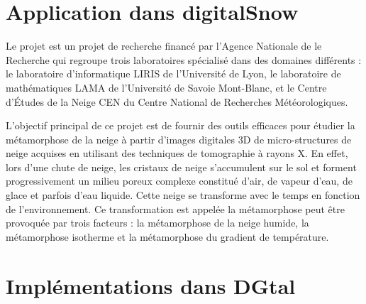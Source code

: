 %
\section{Application dans digitalSnow}%
\label{sec:applications:digitalsnow}
%
Le projet \digitalSnow est un projet de recherche financé par l'Agence Nationale de le
Recherche qui regroupe trois laboratoires spécialisé dans des domaines
différents : le laboratoire d'informatique \textsc{LIRIS} de l'Université de
Lyon, le laboratoire de mathématiques \textsc{LAMA} de l'Université de Savoie
Mont-Blanc, et le Centre d'Études de la Neige \textsc{CEN} du Centre National de
Recherches Météorologiques.


L'objectif principal de ce projet est de fournir des outils efficaces pour
étudier la métamorphose de la neige à partir d'images digitales 3D de
micro-structures de neige acquises en utilisant des techniques de tomographie à
rayons X. En effet, lors d'une chute de neige, les cristaux de neige
s'accumulent sur le sol et forment progressivement un milieu poreux complexe
constitué d'air, de vapeur d'eau, de glace et parfois d'eau liquide. Cette neige
se transforme avec le temps en fonction de l'environnement. Ce transformation
est appelée la métamorphose peut être provoquée par trois facteurs : la
métamorphose de la neige humide, la métamorphose isotherme et la métamorphose du
gradient de température.


%
%
%
%
%
%
%
%
%
%
%
%



\section{Implémentations dans DGtal}%
\label{sec:applications:dgtal}
%
